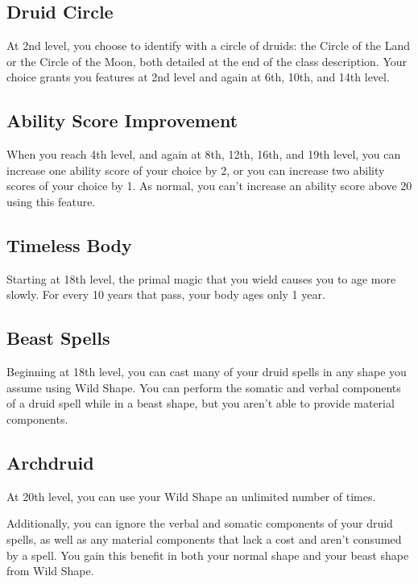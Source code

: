 \subsection{Druid Circle}

At 2nd level, you choose to identify with a circle of druids: the Circle of the Land or the Circle of the Moon, both detailed at the end of the class description. Your choice grants you features at 2nd level and again at 6th, 10th, and 14th level.

\subsection{Ability Score Improvement}

When you reach 4th level, and again at 8th, 12th, 16th, and 19th level, you can increase one ability score of your choice by 2, or you can increase two ability scores of your choice by 1. As normal, you can’t increase an ability score above 20 using this feature.

\subsection{Timeless Body}

Starting at 18th level, the primal magic that you wield causes you to age more slowly. For every 10 years that pass, your body ages only 1 year.

\subsection{Beast Spells}

Beginning at 18th level, you can cast many of your druid spells in any shape you assume using Wild Shape. You can perform the somatic and verbal components of a druid spell while in a beast shape, but you aren’t able to provide material components.

\subsection{Archdruid}

At 20th level, you can use your Wild Shape an unlimited number of times.

Additionally, you can ignore the verbal and somatic components of your druid spells, as well as any material components that lack a cost and aren’t consumed by a spell. You gain this benefit in both your normal shape and your beast shape from Wild Shape.

